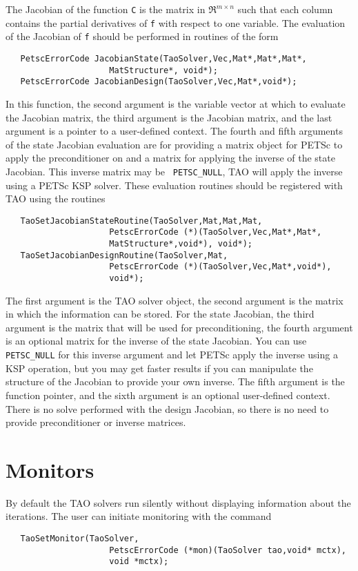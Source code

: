 The Jacobian of the function {\tt C} is the matrix in $\Re^{m \times n}$
such that each column contains the partial derivatives of {\tt f} with respect
to one variable. 
The evaluation of the Jacobian of {\tt f} should be performed in routines
of the form
\begin{verbatim}
   PetscErrorCode JacobianState(TaoSolver,Vec,Mat*,Mat*,Mat*,
                     MatStructure*, void*);
   PetscErrorCode JacobianDesign(TaoSolver,Vec,Mat*,void*);
\end{verbatim}
\noindent
In this function, the second argument is the variable vector at which to 
evaluate the Jacobian matrix, the third argument is the Jacobian matrix,
and the last argument is a pointer to a user-defined context. The fourth and
fifth arguments of the state Jacobian evaluation are for providing a matrix
object 
for PETSc to apply the preconditioner on and a matrix for applying
the inverse of the state Jacobian. This inverse matrix may be {\tt
  PETSC\_NULL},
TAO will apply the inverse using a PETSc KSP solver.
These evaluation routines should be registered with TAO using the routines
\begin{verbatim}
   TaoSetJacobianStateRoutine(TaoSolver,Mat,Mat,Mat,
                     PetscErrorCode (*)(TaoSolver,Vec,Mat*,Mat*,
                     MatStructure*,void*), void*);
   TaoSetJacobianDesignRoutine(TaoSolver,Mat,
                     PetscErrorCode (*)(TaoSolver,Vec,Mat*,void*), 
                     void*);
\end{verbatim}
\noindent
The first argument is the TAO solver object, the second
argument is the matrix in which the information can be stored.
For the state Jacobian, 
the third argument is the matrix that will be used for preconditioning,
the fourth argument is an optional matrix for the inverse of the state 
Jacobian.  You can use {\tt PETSC\_NULL} for this inverse argument and let 
PETSc apply the inverse using a KSP operation, but you may get faster
results if you can manipulate the structure of the Jacobian to provide your
own inverse. The fifth argument is the function pointer, and the sixth argument is
an optional user-defined context. There is no solve performed with the
design Jacobian, so there is no need to provide preconditioner or inverse
matrices.


\section{Monitors}

By default the TAO solvers run silently without displaying information
about the iterations. The user can initiate monitoring with the
command  
\begin{verbatim}
   TaoSetMonitor(TaoSolver,
                     PetscErrorCode (*mon)(TaoSolver tao,void* mctx),
                     void *mctx);
\end{verbatim}
\noindent

